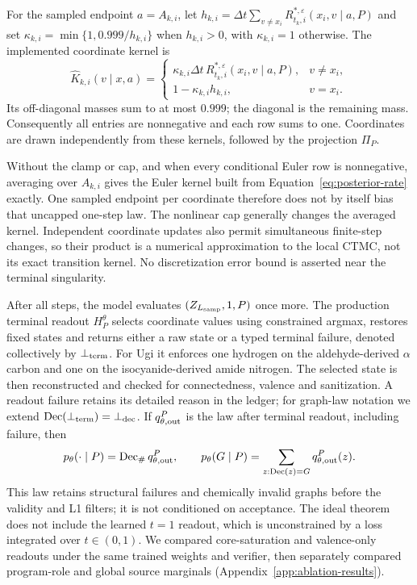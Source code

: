 \documentclass{article}
\theoremstyle{definition}
\begin{document}
For the sampled endpoint $a=A_{k,i}$, let
$h_{k,i}=\Delta t\sum_{v\neq x_i}R_{t_k,i}^{*,\varepsilon}(x_i,v\mid a,P)$ and set
$\kappa_{k,i}=\min\{1,0.999/h_{k,i}\}$ when $h_{k,i}>0$, with $\kappa_{k,i}=1$ otherwise.
The implemented coordinate kernel is
\begin{equation}
 \widehat K_{k,i}(v\mid x,a)=
 \begin{cases}
 \kappa_{k,i}\Delta t\,R_{t_k,i}^{*,\varepsilon}(x_i,v\mid a,P),&v\neq x_i,\\
 1-\kappa_{k,i}h_{k,i},&v=x_i.
 \end{cases}
 \label{eq:capped-kernel}
\end{equation}
Its off-diagonal masses sum to at most $0.999$; the diagonal is the remaining mass. Consequently
all entries are nonnegative and each row sums to one. Coordinates are drawn independently from
these kernels, followed by the projection $\Pi_P$.

Without the clamp or cap, and when every conditional Euler row is nonnegative, averaging over
$A_{k,i}$ gives the Euler kernel built from Equation~\ref{eq:posterior-rate} exactly. One sampled
endpoint per coordinate therefore does not by itself bias that uncapped one-step law. The nonlinear
cap generally changes the averaged kernel. Independent coordinate updates also permit simultaneous
finite-step changes, so their product is a numerical approximation to the local CTMC, not its exact
transition kernel. No discretization error bound is asserted near the terminal singularity.

After all steps, the model evaluates $(Z_{L_{\rm samp}},1,P)$ once more. The production terminal
readout $H_P^\theta$ selects coordinate values using constrained argmax, restores fixed states and
returns either a raw state or a typed terminal failure, denoted collectively by $\bot_{\rm term}$.
For Ugi it enforces one hydrogen on the aldehyde-derived $\alpha$ carbon and one on the
isocyanide-derived amide nitrogen. The selected state is then reconstructed and checked for
connectedness, valence and sanitization. A readout failure retains its detailed reason in the ledger;
for graph-law notation we extend $\operatorname{Dec}(\bot_{\rm term})=\bot_{\rm dec}$.
If $q_{\theta,\rm out}^P$ is the law after terminal readout, including failure, then
\begin{equation}
 p_\theta(\cdot\mid P)=\operatorname{Dec}_{\#}q_{\theta,\rm out}^P,
 \qquad
 p_\theta(G\mid P)=\sum_{z:\operatorname{Dec}(z)=G}q_{\theta,\rm out}^P(z).
 \label{eq:generated-law}
\end{equation}
This law retains structural failures and chemically invalid graphs before the validity and L1
filters; it is not conditioned on acceptance.
The ideal theorem does not include the learned $t=1$ readout, which is unconstrained by a loss
integrated over $t\in(0,1)$. We compared core-saturation and valence-only readouts under the same
trained weights and verifier, then separately compared program-role and global source marginals
(Appendix~\ref{app:ablation-results}).
\end{document}
